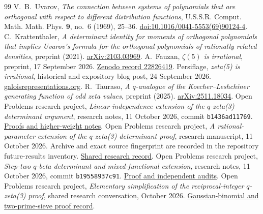\documentclass[11pt,letterpaper]{article}
\numberwithin{equation}{section}
\theoremstyle{remark}
\begin{document}
\begin{thebibliography}{99}
 V.~B.~Uvarov, \emph{The connection between systems of polynomials that are orthogonal with respect to different distribution functions}, U.S.S.R. Comput. Math. Math. Phys. \textbf{9}, no.~6 (1969), 25--36. \href{https://doi.org/10.1016/0041-5553(69)90124-4}{doi:10.1016/0041-5553(69)90124-4}.
 C.~Krattenthaler, \emph{A determinant identity for moments of orthogonal polynomials that implies Uvarov's formula for the orthogonal polynomials of rationally related densities}, preprint (2021). \href{https://arxiv.org/abs/2103.03969}{arXiv:2103.03969}.
 A.~Fauzan, \emph{$\zeta(5)$ is irrational}, preprint, 17 September 2026. \href{https://zenodo.org/records/22826419}{Zenodo record 22826419}.
 Persiflage, \emph{zeta(5) is irrational}, historical and expository blog post, 24 September 2026. \href{https://galoisrepresentations.org/2026/09/24/zeta5-is-irrational/}{galoisrepresentations.org}.
 R.~Tauraso, \emph{A $q$-analogue of the Koecher--Leshchiner generating function of odd zeta values}, preprint (2025). \href{https://arxiv.org/abs/2511.18034}{arXiv:2511.18034}.
 Open Problems research project, \emph{Linear-independence extension of the $q$-zeta(3) determinant argument}, research notes, 11 October 2026, commit \texttt{b1436ad11769}. \href{https://github.com/fikreab-s/the-math-research-ledger/tree/b1436ad117691f96abc5203c14b119555dabf7d1/problems/odd-zeta/computations/qzeta_extensions_20261011}{Proofs and higher-weight notes}.
 Open Problems research project, \emph{A rational-parameter extension of the $q$-zeta(3) determinant proof}, research manuscript, 11 October 2026. Archive and exact source fingerprint are recorded in the repository future-results inventory. \href{https://chatgpt.com/share/6acbb114-bf5c-83ea-8266-be9e1277b62c}{Shared research record}.
 Open Problems research project, \emph{Step-two $q$-beta determinant and mixed-functional extension}, research notes, 11 October 2026, commit \texttt{b19558937c91}. \href{https://github.com/fikreab-s/the-math-research-ledger/tree/b19558937c91876d6330c8464871e146a820c909/problems/odd-zeta/computations/alternatives_20261011}{Proof and independent audits}.
 Open Problems research project, \emph{Elementary simplification of the reciprocal-integer $q$-zeta(3) proof}, shared research conversation, October 2026. \href{https://chatgpt.com/share/6acc2f33-718c-83e8-8975-83e51086d1a6}{Gaussian-binomial and two-prime-sieve proof record}.
\end{thebibliography}
\end{document}
